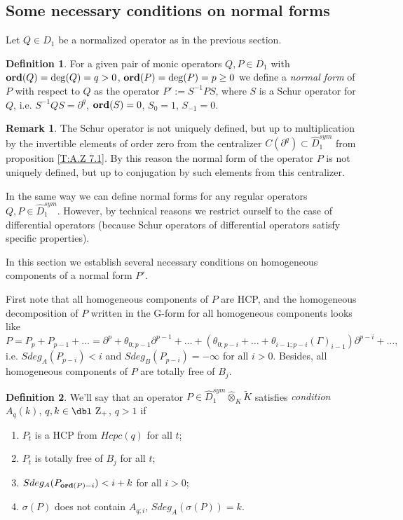 \documentclass[11pt]{article}
\theoremstyle{definition}
\newcommand{\dz}{{\mbox{\dbl Z}}}
\newcommand{\Ord}{\mathop {\rm \bf ord}}
\newtheorem{Def}{Definition}[section]
\newtheorem{rem}{Remark}[section]
\theoremstyle{plain}
\numberwithin{equation}{section}
\begin{document}
\subsection{Some necessary conditions on normal forms}
\label{S:normal forms}

Let $Q\in D_1$ be a normalized operator as in the previous section. 

\begin{Def}
\label{D:normal_form}
For a given pair of monic operators $Q,P\in D_1$ with $\Ord (Q)=\deg (Q)=q> 0$, $\Ord (P)=\deg (P)=p\ge 0$ we define a {\it normal form} of $P$ with respect to $Q$ as the operator $P':=S^{-1}PS$, where $S$ is a Schur operator for $Q$, i.e. $S^{-1}QS=\partial^q$,  $\Ord (S)=0$, $S_0=1$, $S_{-1}=0$. 
\end{Def} 

\begin{rem}
\label{R:normal_forms}
The Schur operator is not uniquely defined, but up to multiplication by the  invertible elements of order zero from the centralizer  $C(\partial^q)\subset \hat{D}_1^{sym}$ from proposition \ref{T:A.Z 7.1}. By this reason the normal form of the operator $P$  is  not uniquely defined, but up to conjugation by such elements from this centralizer. 

In the same way we can define normal forms for any regular operators $Q,P \in \hat{D}_1^{sym}$. However, by technical reasons we restrict ourself to the case of differential operators (because Schur operators of differential operators satisfy specific properties). 
\end{rem}

In this section we establish several necessary conditions on homogeneous components of a normal form $P'$. 

First note that all homogeneous components of $P$ are HCP, and the homogeneous decomposition of $P$ written in the G-form for all homogeneous components looks like 
$$
P=P_p+P_{p-1}+\ldots =\partial^p+\theta_{0;p-1}\partial^{p-1}+\ldots+(\theta_{0;p-i}+\ldots+\theta_{i-1;p-i}(\Gamma)_{i-1})\partial^{p-i}+\ldots ,
$$
i.e. $Sdeg_A(P_{p-i})< i$ and $Sdeg_B (P_{p-i})=-\infty$ for all $i>0$. Besides, all homogeneous components of $P$ are totally free of $B_j$.  

\begin{Def}
\label{D:conditionA}
We'll say that an operator $P\in  \hat{D}_1^{sym}\hat{\otimes}_K\tilde{K}$ satisfies {\it condition $A_q(k)$}, $q,k\in \dz_+$, $q>1$ if 
\begin{enumerate}
\item
$P_{t}$ is a HCP  from $Hcpc (q)$  for all $t$;
\item
$P_{t}$ is totally free of $B_j$ for all $t$;
\item
$Sdeg_A(P_{\Ord (P)-i})< i+k$ for all $i>0$;
\item
$\sigma (P)$ does not contain $A_{q;i}$, $Sdeg_A(\sigma (P))=k$.
\end{enumerate}
\end{Def}
\end{document}
